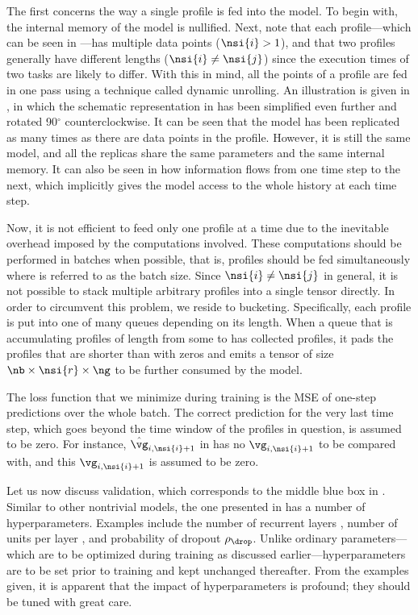 The first concerns the way a single profile is fed into the model. To begin
with, the internal memory of the model is nullified. Next, note that each
profile---which can be seen in ---has multiple data points
($\nsi{i} > 1$), and that two profiles generally have different lengths
($\nsi{i} \neq \nsi{j}$) since the execution times of two tasks are likely to
differ. With this in mind, all the points of a profile are fed in one pass using
a technique called dynamic unrolling. An illustration is given in
, in which the schematic representation in
 has been simplified even further and rotated
90${}^\circ$ counterclockwise. It can be seen that the model has been replicated
as many times as there are data points in the profile. However, it is still the
same model, and all the replicas share the same parameters and the same internal
memory. It can also be seen in  how information flows
from one time step to the next, which implicitly gives the model access to the
whole history at each time step.

Now, it is not efficient to feed only one profile at a time due to the
inevitable overhead imposed by the computations involved. These computations
should be performed in batches when possible, that is, \nb profiles should be
fed simultaneously where \nb is referred to as the batch size. Since $\nsi{i}
\neq \nsi{j}$ in general, it is not possible to stack multiple arbitrary
profiles into a single tensor directly. In order to circumvent this problem, we
reside to bucketing. Specifically, each profile is put into one of many queues
depending on its length. When a queue that is accumulating profiles of length
from some  to  has collected \nb profiles, it pads the profiles
that are shorter than  with zeros and emits a tensor of size $\nb \times
\nsi{r} \times \ng$ to be further consumed by the model.

The loss function that we minimize during training is the \ac{MSE} of one-step
predictions over the whole batch. The correct prediction for the very last time
step, which goes beyond the time window of the profiles in question, is assumed
to be zero. For instance, $\hat{\vg}_{i, \nsi{i} + 1}$ in
 has no $\vg_{i, \nsi{i} + 1}$ to be compared with,
and this $\vg_{i, \nsi{i} + 1}$ is assumed to be zero.

Let us now discuss validation, which corresponds to the middle blue box in
. Similar to other nontrivial models, the one presented in
 has a number of hyperparameters. Examples include
the number of recurrent layers \nl, number of units per layer \nu, and
probability of dropout $\rho_\drop$. Unlike ordinary parameters---which are to
be optimized during training as discussed earlier---hyperparameters are to be
set prior to training and kept unchanged thereafter. From the examples given, it
is apparent that the impact of hyperparameters is profound; they should be tuned
with great care.

